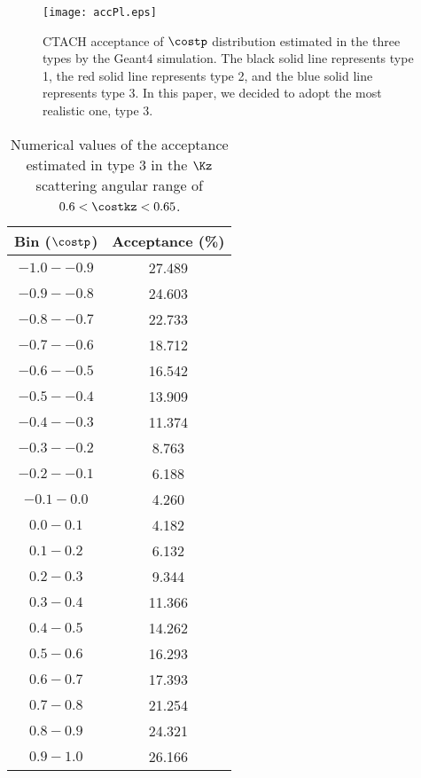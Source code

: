 \begin{figure}[h]
  \centering
  \texttt{[image: accPl.eps]}
  \caption{CTACH acceptance of $\costp$ distribution estimated in the three types by the Geant4 simulation. The black solid line represents type 1, the red solid line represents type 2, and the blue solid line represents type 3. In this paper, we decided to adopt the most realistic one, type 3.}
  \label{fig-accPl}
\end{figure}

\begin{table}[!h] 
  \begin{center}
  \caption{Numerical values of the acceptance estimated in type 3 in the $\Kz$ scattering angular range of \textbf{$0.6<\costkz<0.65$}.}
  \centering
  \begin{threeparttable}
    \begin{tabular}{cc}
    Bin ($\costp$) & Acceptance (\%) \\
    \midrule\midrule
    $-1.0 - -0.9$ & 27.489 \\
    \midrule
    $-0.9 - -0.8$ & 24.603 \\
    \midrule
    $-0.8 - -0.7$ & 22.733 \\
    \midrule
    $-0.7 - -0.6$ & 18.712 \\
    \midrule
    $-0.6 - -0.5$ & 16.542 \\
    \midrule
    $-0.5 - -0.4$ & 13.909 \\
    \midrule
    $-0.4 - -0.3$ & 11.374 \\
    \midrule
    $-0.3 - -0.2$ & 8.763 \\
    \midrule
    $-0.2 - -0.1$ & 6.188 \\
    \midrule
    $-0.1 - 0.0$ & 4.260 \\
    \midrule
    $0.0 - 0.1$ & 4.182 \\
    \midrule
    $0.1 - 0.2$ & 6.132 \\
    \midrule
    $0.2 - 0.3$ & 9.344 \\
    \midrule
    $0.3 - 0.4$ & 11.366 \\
    \midrule
    $0.4 - 0.5$ & 14.262 \\
    \midrule
    $0.5 - 0.6$ & 16.293 \\
    \midrule
    $0.6 - 0.7$ & 17.393 \\
    \midrule
    $0.7 - 0.8$ & 21.254 \\
    \midrule
    $0.8 - 0.9$ & 24.321 \\
    \midrule
    $0.9 - 1.0$ & 26.166 \\
    \end{tabular}
  \end{threeparttable}
  \label{tab-Pl-acc_32}
  \end{center}
\end{table}

